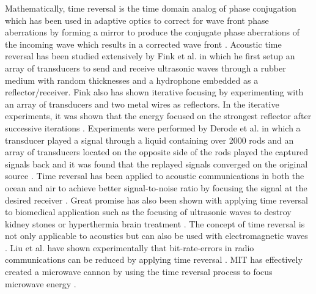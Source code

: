 Mathematically, time reversal is the time domain analog of phase conjugation which has been used in adaptive optics to correct for wave front phase aberrations by forming a mirror to produce the conjugate phase aberrations of the incoming wave which results in a corrected wave front \cite{Pepper1982}. Acoustic time reversal has been studied extensively by Fink et al. in which he first setup an array of transducers to send and receive ultrasonic waves through a rubber medium with random thicknesses and a hydrophone embedded as a reflector/receiver.  Fink also has shown iterative focusing by experimenting with an array of transducers and two metal wires as reflectors. In the iterative experiments, it was shown that the energy focused on the strongest reflector after successive iterations \cite{Fink1993}. Experiments were performed by Derode et al. in which a transducer played a signal through a liquid containing over 2000 rods and an array of transducers located on the opposite side of the rods played the captured signals back and it was found that the replayed signals converged on the original source \cite{Derode1995}. Time reversal has been applied to acoustic communications in both the ocean and air to achieve better signal-to-noise ratio by focusing the signal at the desired receiver \cite{Smith2003, Song2012, Shimura2012}. Great promise has also been shown with applying time reversal to biomedical application such as the focusing of ultrasonic waves to destroy kidney stones or hyperthermia brain treatment \cite{Fink2003}. The concept of time reversal is not only applicable to acoustics but can also be used with electromagnetic waves \cite{Lerosey2004}. Liu et al. have shown experimentally that bit-rate-errors in radio communications can be reduced by applying time reversal \cite{Liu2008}. MIT has effectively created a microwave cannon by using the time reversal process to focus microwave energy \cite{Davy2010}.

